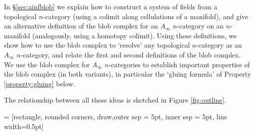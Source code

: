 In  \S \ref{sec:ainfblob} we explain how to construct a system of fields from a topological $n$-category (using a colimit along cellulations of a manifold), and give an alternative definition of the blob complex for an $A_\infty$ $n$-category on an $n$-manifold (analogously, using a homotopy colimit). Using these definitions, we show how to use the blob complex to `resolve' any topological $n$-category as an $A_\infty$ $n$-category, and relate the first and second definitions of the blob complex. We use the blob complex for $A_\infty$ $n$-categories to establish important properties of the blob complex (in both variants), in particular the `gluing formula' of Property \ref{property:gluing} below.

The relationship between all these ideas is sketched in Figure \ref{fig:outline}.


 = [rectangle, rounded corners, draw,outer sep = 5pt, inner sep = 5pt, line width=0.5pt]

